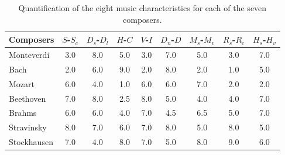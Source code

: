 \documentclass[
 aip,
 jmp,
 amsmath,amssymb,
 reprint,
]{revtex4-1}
\begin{document}
\begin{table}[ht]
\caption{\label{tab:tableAmus}Quantification of the
eight music characteristics for each of the seven composers.}
\begin{ruledtabular}
\begin{tabular}{|l|c|c|c|c|c|c|c|c|}
\footnotesize
\footnotesize Composers    & \tiny  $S$-$S_c$ & \tiny  $D_s$-$D_l$ & \tiny  $H$-$C$ & \tiny  $V$-$I$ & \tiny  $D_n$-$D$ & \tiny  $M_s$-$M_v$ & \tiny  $R_s$-$R_c$ & \tiny  $H_s$-$H_v$  \\
\hline
 \footnotesize Monteverdi   & 3.0 & 8.0 & 5.0 & 3.0 & 7.0 & 5.0 & 3.0 & 7.0  \\
 \footnotesize Bach         & 2.0 & 6.0 & 9.0 & 2.0 & 8.0 & 2.0 & 1.0 & 5.0  \\
 \footnotesize Mozart       & 6.0 & 4.0 & 1.0 & 6.0 & 6.0 & 7.0 & 2.0 & 2.0  \\
 \footnotesize Beethoven    & 7.0 & 8.0 & 2.5 & 8.0 & 5.0 & 4.0 & 4.0 & 7.0  \\
 \footnotesize Brahms       & 6.0 & 6.0 & 4.0 & 7.0 & 4.5 & 6.5 & 5.0 & 7.0  \\
 \footnotesize Stravinsky   & 8.0 & 7.0 & 6.0 & 7.0 & 8.0 & 5.0 & 8.0 & 5.0  \\
 \footnotesize Stockhausen  & 7.0 & 4.0 & 8.0 & 7.0 & 5.0 & 8.0 & 9.0 & 6.0  \\
\end{tabular}
\end{ruledtabular}
\end{table}
\end{document}
